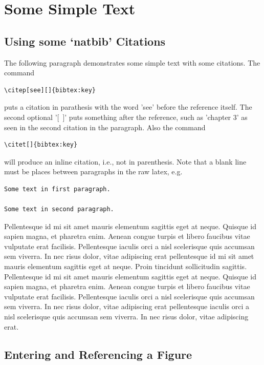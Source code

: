 \chapter{Some Simple Text}

\section{Using some `natbib' Citations}

The following paragraph demonstrates some simple text with some citations. The
command
\begin{verbatim}
\citep[see][]{bibtex:key}
\end{verbatim}
puts a citation in parathesis with the word 'see' before the
reference itself. The second optional '[~]' puts something after the reference,
such as 'chapter 3' as seen in the second citation in the paragraph. Also the
command
\begin{verbatim}
\citet[]{bibtex:key}
\end{verbatim}
will produce an inline citation, i.e., not in parenthesis. Note that a blank
line must be places between paragraphs in the raw latex, e.g.
\begin{verbatim}
Some text in first paragraph.

Some text in second paragraph.
\end{verbatim}

Pellentesque id mi sit amet mauris elementum sagittis eget at neque. Quisque id
sapien magna, et pharetra enim. Aenean congue turpis et libero faucibus vitae
vulputate erat facilisis. Pellentesque iaculis orci a nisl scelerisque quis
accumsan sem viverra. In nec risus dolor, vitae adipiscing erat
\citep[see][]{Solomon:2007:CUP} pellentesque id mi sit amet mauris elementum
sagittis eget at neque. Proin tincidunt sollicitudin sagittis. Pellentesque id
mi sit amet mauris elementum sagittis eget at neque. Quisque id sapien magna, et
pharetra enim. Aenean congue turpis et libero faucibus vitae vulputate erat
facilisis. Pellentesque iaculis orci a nisl scelerisque quis accumsan sem
viverra. In nec risus dolor, vitae adipiscing erat
\citep[see][]{Jaccard:2005:CUP} pellentesque iaculis orci a nisl scelerisque
quis accumsan sem viverra. In nec risus dolor, vitae adipiscing erat.

\section{Entering and Referencing a Figure}

